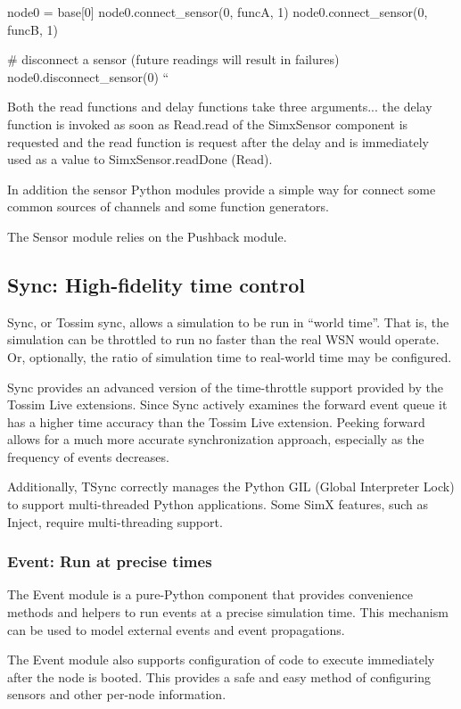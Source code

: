 node0 = base[0]
node0.connect_sensor(0, funcA, 1)
node0.connect_sensor(0, funcB, 1)

# disconnect a sensor (future readings will result in failures)
node0.disconnect_sensor(0)
``

Both the read functions and delay functions take three
arguments... the delay function is invoked as soon as Read.read of the
SimxSensor component is requested and the read function is request
after the delay and is immediately used as a value to
SimxSensor.readDone (Read).

In addition the sensor Python modules provide a simple way for connect
some common sources of channels and some function generators.

The Sensor module relies on the Pushback module.


\subsection{Sync: High-fidelity time control}

Sync, or Tossim sync, allows a simulation to be run in ``world
time''. That is, the simulation can be throttled to run no faster than
the real WSN would operate. Or, optionally, the ratio of simulation
time to real-world time may be configured.

Sync provides an advanced version of the time-throttle support
provided by the Tossim Live extensions. Since Sync actively examines
the forward event queue it has a higher time accuracy than the Tossim
Live extension. Peeking forward allows for a much more accurate
synchronization approach, especially as the frequency of events
decreases.

Additionally, TSync correctly manages the Python GIL (Global
Interpreter Lock) to support multi-threaded Python applications. Some
SimX features, such as Inject, require multi-threading support.


\subsubsection{Event: Run at precise times}

The Event module is a pure-Python component that provides convenience
methods and helpers to run events at a precise simulation time. This
mechanism can be used to model external events and event propagations.

The Event module also supports configuration of code to execute
immediately after the node is booted. This provides a safe and easy
method of configuring sensors and other per-node information.


